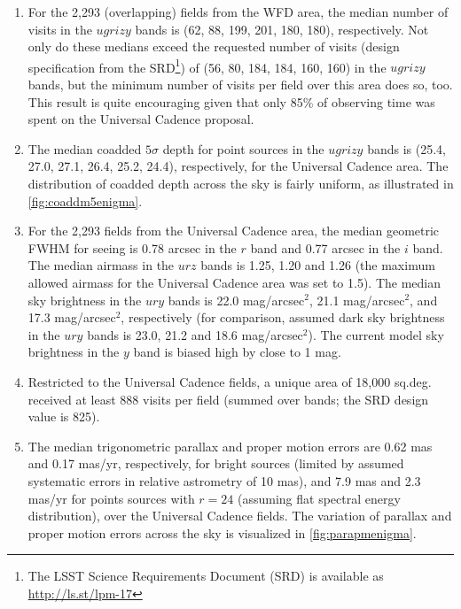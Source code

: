 \begin{enumerate}
brighter for non-dark time and away from zenith, the sky brightness model
currently implemented in \OpSim has some shortcomings (a new model will
be implemented in version 4), and the moon avoidance is not as aggressive
as it could be. As a result, the limiting depths above are biased bright by close
to 1 mag in the $z$ and $y$ bands, and a few tenths of a magnitude in the
$u$, $g$ and $i$ bands. The co-added depths are tied to single-visit bands,
and suffer from the same bias.
\item For the 2,293 (overlapping) fields from the WFD area,
the median number of visits in the $ugrizy$ bands is (62, 88, 199, 201, 180,
180), respectively. Not only do these medians exceed the requested
number of visits (design specification from the SRD\footnote{The LSST
Science Requirements Document (SRD) is available as
\url{http://ls.st/lpm-17}}) of (56, 80, 184, 184, 160, 160) in the $ugrizy$
bands, but the minimum number of visits per field over this area does
so, too. This result is quite encouraging given that
only 85\% of observing time was spent on the Universal Cadence proposal.
\item The median coadded $5\sigma$ depth
for point sources in the $ugrizy$ bands is (25.4, 27.0, 27.1, 26.4,
25.2, 24.4), respectively, for the Universal Cadence area. The distribution
of coadded depth across the sky is fairly uniform, as illustrated in \autoref{fig:coaddm5enigma}.
\item For the 2,293 fields from the Universal Cadence area, the median
geometric FWHM for seeing is 0.78 arcsec in the $r$ band and 0.77 arcsec
in the $i$ band. The median airmass in the $urz$ bands is 1.25, 1.20 and 1.26
(the maximum allowed airmass for the Universal Cadence area was set to
1.5).  The median sky brightness in the $ury$ bands is 22.0 mag/arcsec$^2$,
21.1 mag/arcsec$^2$, and 17.3 mag/arcsec$^2$, respectively (for comparison,
assumed dark sky brightness in the $ury$ bands is 23.0, 21.2 and 18.6
mag/arcsec$^2$).  The current model sky brightness in the $y$ band is biased
high by close to 1 mag.
\item Restricted to the Universal Cadence fields, a unique area of
18,000 sq.deg. received at least 888 visits per field (summed over bands;
the SRD design value is 825).
\item The median trigonometric parallax and proper motion errors are
0.62 mas and 0.17 mas/yr, respectively, for bright sources (limited by
assumed systematic errors in relative astrometry of 10 mas), and 7.9
mas and 2.3 mas/yr for points sources with $r=24$ (assuming flat
spectral energy distribution), over the Universal Cadence fields. The
variation of parallax and proper motion errors across the sky is
visualized in \autoref{fig:parapmenigma}.
\end{enumerate}





